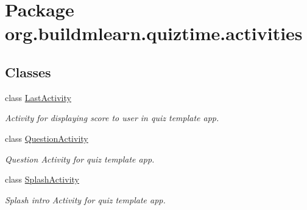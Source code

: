 \hypertarget{namespaceorg_1_1buildmlearn_1_1quiztime_1_1activities}{}\section{Package org.\+buildmlearn.\+quiztime.\+activities}
\label{namespaceorg_1_1buildmlearn_1_1quiztime_1_1activities}
\subsection*{Classes}
\begin{DoxyCompactItemize}
\item 
class \hyperlink{classorg_1_1buildmlearn_1_1quiztime_1_1activities_1_1LastActivity}{Last\+Activity}
\begin{DoxyCompactList}\small\item\em Activity for displaying score to user in quiz template app. \end{DoxyCompactList}\item 
class \hyperlink{classorg_1_1buildmlearn_1_1quiztime_1_1activities_1_1QuestionActivity}{Question\+Activity}
\begin{DoxyCompactList}\small\item\em Question Activity for quiz template app. \end{DoxyCompactList}\item 
class \hyperlink{classorg_1_1buildmlearn_1_1quiztime_1_1activities_1_1SplashActivity}{Splash\+Activity}
\begin{DoxyCompactList}\small\item\em Splash intro Activity for quiz template app. \end{DoxyCompactList}\end{DoxyCompactItemize}
